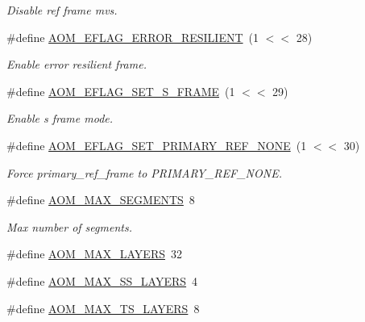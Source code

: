 \begin{DoxyCompactItemize}
\begin{DoxyCompactList}\small\item\em Disable ref frame mvs. \end{DoxyCompactList}\item 
\#define \hyperlink{group__aom__encoder_gaf8d13359c477e5787cf67b6e583317a0}{A\+O\+M\+\_\+\+E\+F\+L\+A\+G\+\_\+\+E\+R\+R\+O\+R\+\_\+\+R\+E\+S\+I\+L\+I\+E\+NT}~(1 $<$$<$ 28)
\begin{DoxyCompactList}\small\item\em Enable error resilient frame. \end{DoxyCompactList}\item 
\#define \hyperlink{group__aom__encoder_ga98480541d93f77481d44dfb0896fcdc5}{A\+O\+M\+\_\+\+E\+F\+L\+A\+G\+\_\+\+S\+E\+T\+\_\+\+S\+\_\+\+F\+R\+A\+ME}~(1 $<$$<$ 29)
\begin{DoxyCompactList}\small\item\em Enable s frame mode. \end{DoxyCompactList}\item 
\#define \hyperlink{group__aom__encoder_ga0f19205f8fb08e9d9aa49403428ff33b}{A\+O\+M\+\_\+\+E\+F\+L\+A\+G\+\_\+\+S\+E\+T\+\_\+\+P\+R\+I\+M\+A\+R\+Y\+\_\+\+R\+E\+F\+\_\+\+N\+O\+NE}~(1 $<$$<$ 30)
\begin{DoxyCompactList}\small\item\em Force primary\+\_\+ref\+\_\+frame to P\+R\+I\+M\+A\+R\+Y\+\_\+\+R\+E\+F\+\_\+\+N\+O\+NE. \end{DoxyCompactList}\item 
\#define \hyperlink{group__aom__encoder_ga58817629f5270c0db0851e354cd6e57c}{A\+O\+M\+\_\+\+M\+A\+X\+\_\+\+S\+E\+G\+M\+E\+N\+TS}~8
\begin{DoxyCompactList}\small\item\em Max number of segments. \end{DoxyCompactList}\item 
\#define \hyperlink{group__aom__encoder_ga3589babe0100b5bf7dc7167675014608}{A\+O\+M\+\_\+\+M\+A\+X\+\_\+\+L\+A\+Y\+E\+RS}~32
\item 
\#define \hyperlink{group__aom__encoder_ga9f3d7cfaa6290b207c0ce360ed63ae45}{A\+O\+M\+\_\+\+M\+A\+X\+\_\+\+S\+S\+\_\+\+L\+A\+Y\+E\+RS}~4
\item 
\#define \hyperlink{group__aom__encoder_ga5ecd6f60f02c807e0de37df7b7278f4e}{A\+O\+M\+\_\+\+M\+A\+X\+\_\+\+T\+S\+\_\+\+L\+A\+Y\+E\+RS}~8
\end{DoxyCompactItemize}

